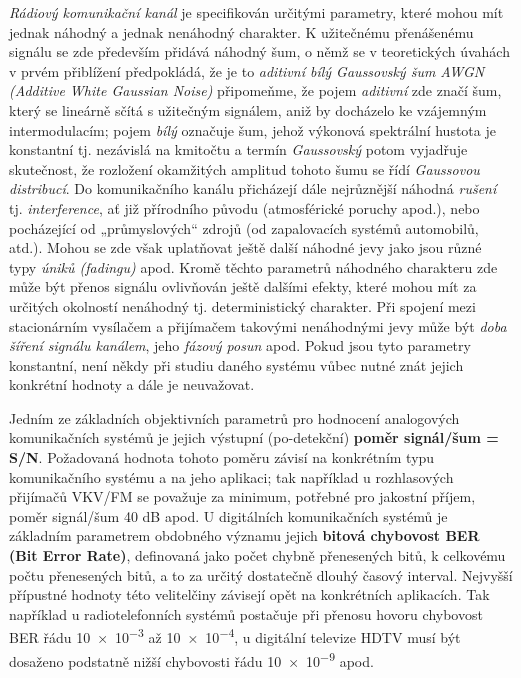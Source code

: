     \emph{Rádiový komunikační kanál} je specifikován určitými parametry, které mohou mít jednak náhodný a 
    jednak nenáhodný charakter. K užitečnému přenášenému signálu se zde především přidává náhodný šum, o němž 
    se v teoretických úvahách v prvém přiblížení předpokládá, že je to \emph{aditivní bílý Gaussovský šum 
    AWGN (Additive White Gaussian Noise)} připomeňme, že pojem \emph{aditivní} zde značí šum, který se 
    lineárně sčítá s užitečným signálem, aniž by docházelo ke vzájemným intermodulacím; pojem \emph{bílý} 
    označuje šum, jehož výkonová spektrální hustota je konstantní tj. nezávislá na kmitočtu a termín 
    \emph{Gaussovský} potom vyjadřuje skutečnost, že rozložení okamžitých amplitud tohoto šumu se řídí 
    \emph{Gaussovou distribucí}. Do komunikačního kanálu přicházejí dále nejrůznější náhodná \emph{rušení} 
    tj. \emph{interference}, ať již přírodního původu (atmosférické poruchy apod.), nebo pocházející od 
    „průmyslových“ zdrojů (od zapalovacích systémů automobilů, atd.). Mohou se zde však uplatňovat ještě 
    další náhodné jevy jako jsou různé typy \emph{úniků (fadingu)} apod. Kromě těchto parametrů náhodného 
    charakteru zde může být přenos signálu ovlivňován ještě dalšími efekty, které mohou mít za určitých 
    okolností nenáhodný tj. deterministický charakter. Při spojení mezi stacionárním vysílačem a přijímačem 
    takovými nenáhodnými jevy může být \emph{doba šíření signálu kanálem}, jeho \emph{fázový posun} apod. 
    Pokud jsou tyto parametry konstantní, není někdy při studiu daného systému vůbec nutné znát jejich 
    konkrétní hodnoty a dále je neuvažovat.
    
    Jedním ze základních objektivních parametrů pro hodnocení analogových komunikačních systémů je jejich 
    výstupní (po-detekční) \textbf{poměr signál/šum = S/N}. Požadovaná hodnota tohoto poměru závisí na 
    konkrétním typu komunikačního systému a na jeho aplikaci; tak například u rozhlasových přijímačů VKV/FM 
    se považuje za minimum, potřebné pro jakostní příjem, poměr signál/šum 40 dB apod. U digitálních 
    komunikačních systémů je základním parametrem obdobného významu jejich \textbf{bitová chybovost BER (Bit 
    Error Rate)}, definovaná jako počet chybně přenesených bitů, k celkovému počtu přenesených bitů, a to za 
    určitý dostatečně dlouhý časový interval. Nejvyšší přípustné hodnoty této velitelčiny závisejí opět na 
    konkrétních aplikacích. Tak například u radiotelefonních systémů postačuje při přenosu hovoru chybovost 
    BER řádu \num{10e-3} až \num{10e-4}, u digitální televize HDTV musí být dosaženo podstatně nižší 
    chybovosti řádu \num{10e-9} apod.
    
